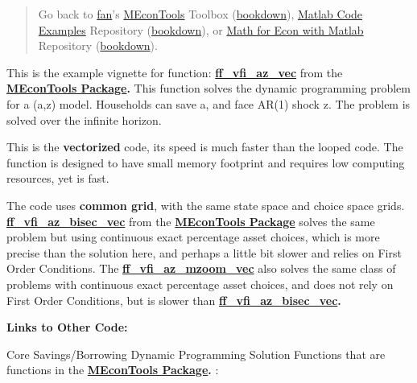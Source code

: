 \documentclass[
]{book}
\begin{document}
\begin{quote}
Go back to \href{http://fanwangecon.github.io/}{fan}'s \href{https://fanwangecon.github.io/MEconTools/}{MEconTools} Toolbox (\href{https://fanwangecon.github.io/MEconTools/bookdown}{bookdown}), \href{https://fanwangecon.github.io/M4Econ/}{Matlab Code Examples} Repository (\href{https://fanwangecon.github.io/M4Econ/bookdown}{bookdown}), or \href{https://fanwangecon.github.io/Math4Econ/}{Math for Econ with Matlab} Repository (\href{https://fanwangecon.github.io/Math4Econ/bookdown}{bookdown}).
\end{quote}

This is the example vignette for function:
\href{https://github.com/FanWangEcon/MEconTools/blob/master/MEconTools/vfi/ff_vfi_az_vec.m}{\textbf{ff\_vfi\_az\_vec}}
from the \href{https://fanwangecon.github.io/MEconTools/}{\textbf{MEconTools
Package}}\textbf{.} This function
solves the dynamic programming problem for a (a,z) model. Households can
save a, and face AR(1) shock z. The problem is solved over the infinite
horizon.

This is the \textbf{vectorized} code, its speed is much faster than the
looped code. The function is designed to have small memory footprint and
requires low computing resources, yet is fast.

The code uses \textbf{common grid}, with the same state space and choice
space grids.
\href{https://github.com/FanWangEcon/MEconTools/blob/master/MEconTools/vfi/ff_vfi_az_bisec_vec.m}{\textbf{ff\_vfi\_az\_bisec\_vec}}
from the \href{https://fanwangecon.github.io/MEconTools/}{\textbf{MEconTools
Package}} solves the same
problem but using continuous exact percentage asset choices, which is
more precise than the solution here, and perhaps a little bit slower and
relies on First Order Conditions. The
\href{https://github.com/FanWangEcon/MEconTools/blob/master/MEconTools/vfi/ff_vfi_az_mzoom_vec.m}{\textbf{ff\_vfi\_az\_mzoom\_vec}}
also solves the same class of problems with continuous exact percentage
asset choices, and does not rely on First Order Conditions, but is
slower than
\href{https://github.com/FanWangEcon/MEconTools/blob/master/MEconTools/vfi/ff_vfi_az_bisec_vec.m}{\textbf{ff\_vfi\_az\_bisec\_vec}}\textbf{.}

\textbf{Links to Other Code:}

Core Savings/Borrowing Dynamic Programming Solution Functions that are
functions in the \href{https://fanwangecon.github.io/MEconTools/}{\textbf{MEconTools
Package}}\textbf{.} :
\end{document}
